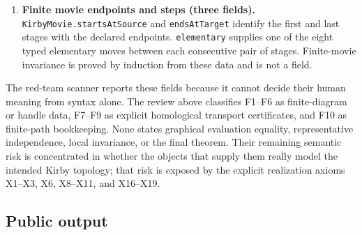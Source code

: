 \begin{enumerate}[label=\textbf{F\arabic*.},leftmargin=*]
\item \textbf{Finite movie endpoints and steps (three fields).}
\texttt{KirbyMovie.startsAtSource} and \texttt{endsAtTarget} identify the first
and last stages with the declared endpoints.  \texttt{elementary} supplies one
of the eight typed elementary moves between each consecutive pair of stages.
Finite-movie invariance is proved by induction from these data and is not a
field.

\end{enumerate}

The red-team scanner reports these fields because it cannot decide their
human meaning from syntax alone.  The review above classifies F1--F6 as
finite-diagram or handle data, F7--F9 as explicit homological transport
certificates, and F10 as finite-path bookkeeping.  None states graphical
evaluation equality, representative independence, local invariance, or the
final theorem.  Their remaining semantic risk is concentrated in whether the
objects that supply them really model the intended Kirby topology; that risk
is exposed by the explicit realization axioms X1--X3, X6, X8--X11, and X16--X19.

\subsection{Public output}
\label{app:lean-public-output}

